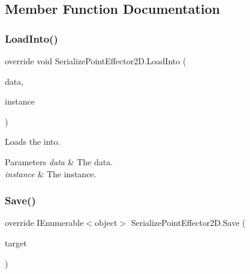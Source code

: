 \subsection{Member Function Documentation}
\mbox{\label{class_serialize_point_effector2_d_a473636d957e184b107602f3f8c1c4b8d}} 
\subsubsection{\texorpdfstring{Load\+Into()}{LoadInto()}}
{\footnotesize\ttfamily override void Serialize\+Point\+Effector2\+D.\+Load\+Into (\begin{DoxyParamCaption}\item[{object \mbox{[}$\,$\mbox{]}}]{data,  }\item[{Point\+Effector2D}]{instance }\end{DoxyParamCaption})\hspace{0.3cm}{\ttfamily [inline]}}



Loads the into. 


\begin{DoxyParams}{Parameters}
{\em data} & The data.\\
\hline
{\em instance} & The instance.\\
\hline
\end{DoxyParams}
\mbox{\label{class_serialize_point_effector2_d_a013456d629025d927b70f26f3684d159}} 
\subsubsection{\texorpdfstring{Save()}{Save()}}
{\footnotesize\ttfamily override I\+Enumerable$<$object$>$ Serialize\+Point\+Effector2\+D.\+Save (\begin{DoxyParamCaption}\item[{Point\+Effector2D}]{target }\end{DoxyParamCaption})\hspace{0.3cm}{\ttfamily [inline]}}



